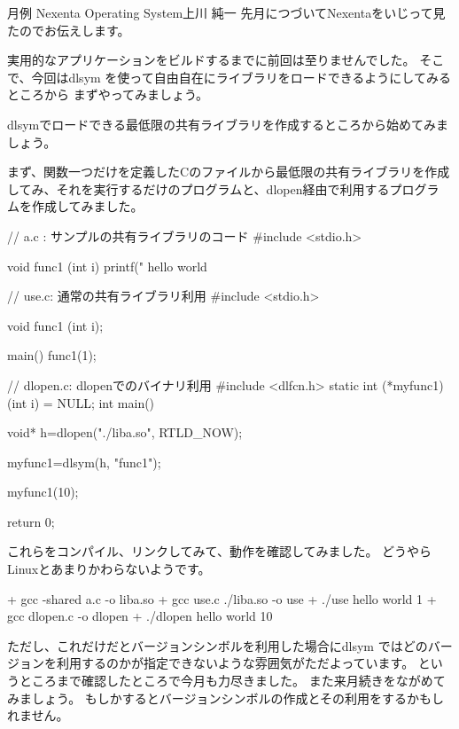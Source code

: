 \documentclass[mingoth,a4paper]{jsarticle}
\begin{document}
\begin{getsureiupdate}{月例 Nexenta Operating System}{上川 純一}
先月につづいてNexentaをいじって見たのでお伝えします。

実用的なアプリケーションをビルドするまでに前回は至りませんでした。
そこで、今回はdlsym を使って自由自在にライブラリをロードできるようにしてみるところから
 まずやってみましょう。

dlsymでロードできる最低限の共有ライブラリを作成するところから始めてみま
しょう。


まず、関数一つだけを定義したCのファイルから最低限の共有ライブラリを作成
 してみ、それを実行するだけのプログラムと、dlopen経由で利用するプログラ
 ムを作成してみました。

\begin{commandline}
// a.c : サンプルの共有ライブラリのコード
#include <stdio.h>

void func1 (int i)
{
  printf(" hello world %
}
\end{commandline}

\begin{commandline}
// use.c: 通常の共有ライブラリ利用
#include <stdio.h>

void func1 (int i);

main()
{
  func1(1);
}
\end{commandline}

\begin{commandline}
// dlopen.c: dlopenでのバイナリ利用
#include <dlfcn.h>
static int (*myfunc1)(int i) = NULL;
int main()
{
  void* h=dlopen("./liba.so", RTLD_NOW);
  
  myfunc1=dlsym(h, "func1");
  
  myfunc1(10);
  
  return 0;
}
\end{commandline}

これらをコンパイル、リンクしてみて、動作を確認してみました。
どうやらLinuxとあまりかわらないようです。

\begin{commandline}
 + gcc -shared a.c -o liba.so
 + gcc use.c ./liba.so -o use
 + ./use
 hello world 1
 + gcc dlopen.c -o dlopen
 + ./dlopen
 hello world 10
\end{commandline}

ただし、これだけだとバージョンシンボルを利用した場合にdlsym ではどのバー
 ジョンを利用するのかが指定できないような雰囲気がただよっています。
というところまで確認したところで今月も力尽きました。
また来月続きをながめてみましょう。
もしかするとバージョンシンボルの作成とその利用をするかもしれません。

\end{getsureiupdate}
\end{document}
